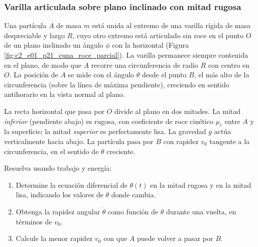 \subsubsection{Varilla articulada sobre plano inclinado con mitad rugosa}

Una partícula $A$ de masa $m$ está unida al extremo de una varilla rígida de masa despreciable y largo $R$, cuyo otro extremo está articulado sin roce en el punto $O$ de un plano inclinado un ángulo $\phi$ con la horizontal (Figura \ref{fig:c2_e01_p21_cuna_roce_parcial}). La varilla permanece siempre contenida en el plano, de modo que $A$ recorre una circunferencia de radio $R$ con centro en $O$. La posición de $A$ se mide con el ángulo $\theta$ desde el punto $B$, el más alto de la circunferencia (sobre la línea de máxima pendiente), creciendo en sentido antihorario en la vista normal al plano.

La recta horizontal que pasa por $O$ divide al plano en dos mitades. La mitad \emph{inferior} (pendiente abajo) es rugosa, con coeficiente de roce cinético $\mu_c$ entre $A$ y la superficie; la mitad \emph{superior} es perfectamente lisa. La gravedad $g$ actúa verticalmente hacia abajo. La partícula pasa por $B$ con rapidez $v_0$ tangente a la circunferencia, en el sentido de $\theta$ creciente.

Resuelva usando trabajo y energía:
\begin{enumerate}
    \item Determine la ecuación diferencial de $\theta(t)$ en la mitad rugosa y en la mitad lisa, indicando los valores de $\theta$ donde cambia.
    \item Obtenga la rapidez angular $\dot\theta$ como función de $\theta$ durante una vuelta, en términos de $v_0$.
    \item Calcule la menor rapidez $v_0$ con que $A$ puede volver a pasar por $B$.
\end{enumerate}

